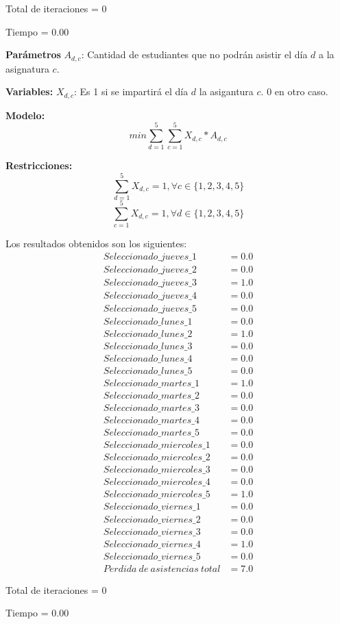 \documentclass[titlepage, 11pt]{scrartcl}
\begin{document}
{\begin{description}
			Total de iteraciones = 0
			
			Tiempo = 0.00
			
			\item[4]
			
			\textbf{Parámetros}
					$A_{d, c}$: Cantidad de estudiantes que no podrán asistir el día $d$ a la asignatura $c$.

			
			\textbf{Variables:}
					$X_{d, c}$: Es 1 si se impartirá el día $d$ la asigantura $c$. 0 en otro caso.
			
			\textbf{Modelo:}
				$$min \sum_{d=1}^{5} \sum_{c=1}^{5}X_{d, c} * A_{d, c}$$
			
			
			\textbf{Restricciones:}
				$$\sum_{d=1}^{5}X_{d, c} = 1, \forall c \in \{1, 2, 3, 4, 5\}$$
				$$\sum_{c=1}^{5}X_{d, c} = 1, \forall d \in \{1, 2, 3, 4, 5\}$$
			
			Los resultados obtenidos son los siguientes:
			\begin{align*}
				Seleccionado\_jueves\_1 &= 0.0\\
				Seleccionado\_jueves\_2 &= 0.0\\
				Seleccionado\_jueves\_3 &= 1.0\\
				Seleccionado\_jueves\_4 &= 0.0\\
				Seleccionado\_jueves\_5 &= 0.0\\
				Seleccionado\_lunes\_1 &= 0.0\\
				Seleccionado\_lunes\_2 &= 1.0\\
				Seleccionado\_lunes\_3 &= 0.0\\
				Seleccionado\_lunes\_4 &= 0.0\\
				Seleccionado\_lunes\_5 &= 0.0\\
				Seleccionado\_martes\_1 &= 1.0\\
				Seleccionado\_martes\_2 &= 0.0\\
				Seleccionado\_martes\_3 &= 0.0\\
				Seleccionado\_martes\_4 &= 0.0\\
				Seleccionado\_martes\_5 &= 0.0\\
				Seleccionado\_miercoles\_1 &= 0.0\\
				Seleccionado\_miercoles\_2 &= 0.0\\
				Seleccionado\_miercoles\_3 &= 0.0\\
				Seleccionado\_miercoles\_4 &= 0.0\\
				Seleccionado\_miercoles\_5 &= 1.0\\
				Seleccionado\_viernes\_1 &= 0.0\\
				Seleccionado\_viernes\_2 &= 0.0\\
				Seleccionado\_viernes\_3 &= 0.0\\
				Seleccionado\_viernes\_4 &= 1.0\\
				Seleccionado\_viernes\_5 &= 0.0\\
				Perdida \ de \ asistencias \ total&=  7.0			
			\end{align*}
			
			Total de iteraciones = 0
			
			Tiempo = 0.00
    	\end{description}

	}
\end{document}
